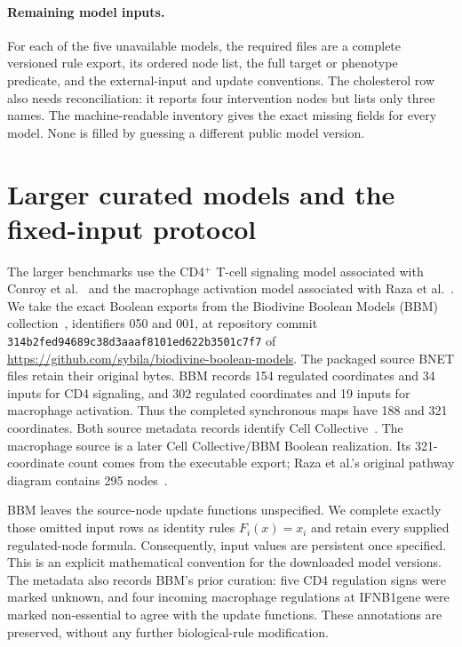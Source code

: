 \paragraph{Remaining model inputs.}
For each of the five unavailable models, the required files are a complete
versioned rule export, its ordered node list, the full target or phenotype
predicate, and the external-input and update conventions. The cholesterol
row also needs reconciliation: it reports four intervention nodes but
lists only three names. The machine-readable inventory gives the exact
missing fields for every model. None is filled by guessing a different
public model version.

\section{Larger curated models and the fixed-input protocol}\label{sec:largeprotocol}
The larger benchmarks use the CD4$^+$ T-cell signaling model associated
with Conroy et al.\ \cite{Conroy2014} and the macrophage activation model
associated with Raza et al.\ \cite{Raza2008}. We take the exact Boolean
exports from the Biodivine Boolean Models (BBM) collection~\cite{Pastva2023},
identifiers 050 and 001, at repository commit
\texttt{314b2fed94689c38d3aaaf8101ed622b3501c7f7} of
\url{https://github.com/sybila/biodivine-boolean-models}.
The packaged source BNET files retain their original bytes. BBM records
154 regulated coordinates and 34 inputs for CD4 signaling, and 302
regulated coordinates and 19 inputs for macrophage activation. Thus the
completed synchronous maps have 188 and 321 coordinates.
Both source metadata records identify Cell Collective~\cite{Helikar2012}. The macrophage source is a later Cell Collective/BBM Boolean realization.
Its 321-coordinate count comes from the executable export; Raza et al.'s
original pathway diagram contains 295 nodes~\cite{Raza2008}.

BBM leaves the source-node update functions unspecified. We complete
exactly those omitted input rows as identity rules $F_i(x)=x_i$ and retain
every supplied regulated-node formula. Consequently, input values are
persistent once specified. This is an explicit mathematical convention
for the downloaded model versions. The metadata also records BBM's prior
curation: five CD4 regulation signs were marked unknown, and four incoming
macrophage regulations at IFNB1gene were marked non-essential to agree
with the update functions. These annotations are preserved, without any
further biological-rule modification.

